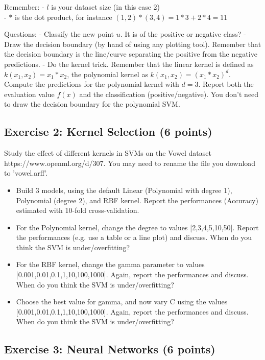 \documentclass[11pt]{article}
\providecommand{\tightlist}{%
      \setlength{\itemsep}{0pt}\setlength{\parskip}{0pt}}
\begin{document}
Remember: - \(l\) is your dataset size (in this case 2)\\
- \(*\) is the dot product, for instance \((1,2)*(3,4)=1*3+2*4=11\)

    Questions: - Classify the new point \(u\). It is of the positive or
negative class? - Draw the decision boundary (by hand of using any
plotting tool). Remember that the decision boundary is the line/curve
separating the positive from the negative predictions. - Do the kernel
trick. Remember that the linear kernel is defined as
\(k(x_1,x_2) = x_1 * x_2\), the polynomial kernel as
\(k(x_1,x_2) = (x_1 * x_2)^d\). Compute the predictions for the
polynomial kernel with \(d=3\). Report both the evaluation value
\(f(x)\) and the classification (positive/negative). You don't need to
draw the decision boundary for the polynomial SVM.

    \subsection{Exercise 2: Kernel Selection (6
points)}\label{exercise-2-kernel-selection-6-points}

Study the effect of different kernels in SVMs on the Vowel dataset
https://www.openml.org/d/307. You may need to rename the file you
download to 'vowel.arff'.

\begin{itemize}
\tightlist
\item
  Build 3 models, using the default Linear (Polynomial with degree 1),
  Polynomial (degree 2), and RBF kernel. Report the performances
  (Accuracy) estimated with 10-fold cross-validation.
\item
  For the Polynomial kernel, change the degree to values
  {[}2,3,4,5,10,50{]}. Report the performances (e.g. use a table or a
  line plot) and discuss. When do you think the SVM is
  under/overfitting?
\item
  For the RBF kernel, change the gamma parameter to values
  {[}0.001,0.01,0.1,1,10,100,1000{]}. Again, report the performances and
  discuss. When do you think the SVM is under/overfitting?
\item
  Choose the best value for gamma, and now vary C using the values
  {[}0.001,0.01,0.1,1,10,100,1000{]}. Again, report the performances and
  discuss. When do you think the SVM is under/overfitting?
\end{itemize}

    \subsection{Exercise 3: Neural Networks (6
points)}\label{exercise-3-neural-networks-6-points}
\end{document}
